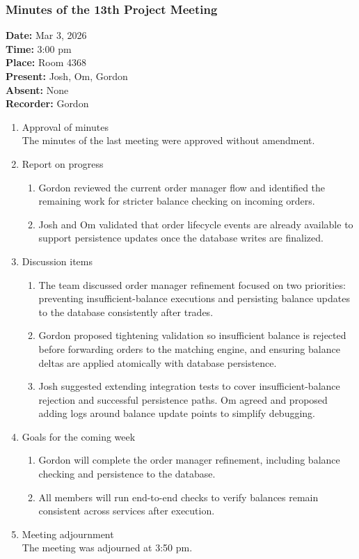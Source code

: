 \documentclass[12pt,a4paper]{article}
\begin{document}
\subsubsection{Minutes of the 13th Project Meeting}
\textbf{Date:} Mar 3, 2026\\
\textbf{Time:} 3:00 pm\\
\textbf{Place:} Room 4368\\
\textbf{Present:} Josh, Om, Gordon\\
\textbf{Absent:} None\\
\textbf{Recorder:} Gordon

\begin{enumerate}
\item Approval of minutes\\
The minutes of the last meeting were approved without amendment.\\
\item Report on progress
\begin{enumerate}
\item Gordon reviewed the current order manager flow and identified the remaining work for stricter balance checking on incoming orders.\\
\item Josh and Om validated that order lifecycle events are already available to support persistence updates once the database writes are finalized.\\
\end{enumerate}
\item Discussion items
\begin{enumerate}
\item The team discussed order manager refinement focused on two priorities: preventing insufficient-balance executions and persisting balance updates to the database consistently after trades.\\
\item Gordon proposed tightening validation so insufficient balance is rejected before forwarding orders to the matching engine, and ensuring balance deltas are applied atomically with database persistence.\\
\item Josh suggested extending integration tests to cover insufficient-balance rejection and successful persistence paths. Om agreed and proposed adding logs around balance update points to simplify debugging.\\
\end{enumerate}
\item Goals for the coming week
\begin{enumerate}
\item Gordon will complete the order manager refinement, including balance checking and persistence to the database.\\
\item All members will run end-to-end checks to verify balances remain consistent across services after execution.\\
\end{enumerate}
\item Meeting adjournment\\
The meeting was adjourned at 3:50 pm.
\end{enumerate}
\end{document}
